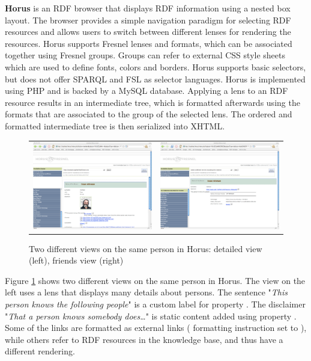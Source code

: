\vspace{1em}
{\bf Horus} is an RDF browser that displays RDF information using a nested box layout. The browser provides a simple navigation paradigm for selecting RDF resources and allows users to switch between different lenses for rendering the resources. Horus supports Fresnel lenses and formats, which can be associated together using Fresnel groups. Groups can refer to external CSS style sheets which are used to define fonts, colors and borders. Horus supports basic selectors, but does not offer SPARQL and FSL as selector languages. Horus is implemented using PHP and is backed by a MySQL database. Applying a lens to an RDF resource results in an intermediate tree, which is formatted afterwards using the formats that are associated to the group of the selected lens. The ordered and formatted intermediate tree is then serialized into XHTML.  

\begin{figure}
\begin{tabular}{cc}
\includegraphics[width=6cm]{horus1.pdf} \hspace{0.02cm} &
\includegraphics[width=6cm]{horus2.pdf} \\
\end{tabular}
\vspace{-1em}
\caption{Two different views on the same person in Horus: detailed view (left), friends view (right)}
\label{horusFig1}
\vspace{-1.1em}
\end{figure}

Figure \ref{horusFig1} shows two different views on the same person in Horus. The view on the left uses a lens that displays many details about persons. The sentence "{\em This person knows the following people}" is a custom label for property . The disclaimer "{\em That a person knows somebody does\ldots}" is static content added using property . Some of the links are formatted as external links ( formatting instruction set to ), while others refer to RDF resources in the knowledge base, and thus have a different rendering.

